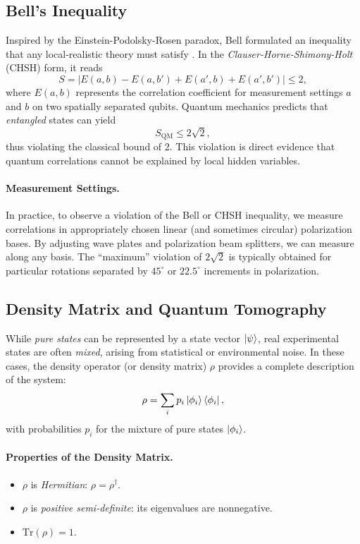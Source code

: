 \subsection{Bell's Inequality}
Inspired by the Einstein-Podolsky-Rosen paradox, Bell formulated an inequality that any local-realistic theory must satisfy \cite{Bell1964}. In the \emph{Clauser-Horne-Shimony-Holt} (CHSH) form, it reads
\[
S = | E(a,b) - E(a,b') + E(a',b) + E(a',b') | \le 2,
\]
where $E(a,b)$ represents the correlation coefficient for measurement settings $a$ and $b$ on two spatially separated qubits. Quantum mechanics predicts that \emph{entangled} states can yield
\[
S_\text{QM} \le 2\sqrt{2},
\]
thus violating the classical bound of 2. This violation is direct evidence that quantum correlations cannot be explained by local hidden variables.

\paragraph{Measurement Settings.}
In practice, to observe a violation of the Bell or CHSH inequality, we measure correlations in appropriately chosen linear (and sometimes circular) polarization bases. By adjusting wave plates and polarization beam splitters, we can measure along any basis. The ``maximum'' violation of $2\sqrt{2}$ is typically obtained for particular rotations separated by $45^\circ$ or $22.5^\circ$ increments in polarization.

\subsection{Density Matrix and Quantum Tomography}
While \emph{pure states} can be represented by a state vector $\ket{\psi}$, real experimental states are often \emph{mixed}, arising from statistical or environmental noise. In these cases, the density operator (or density matrix) $\rho$ provides a complete description of the system:
\[
\rho = \sum_i p_i \ket{\phi_i}\bra{\phi_i},
\]
with probabilities $p_i$ for the mixture of pure states $\ket{\phi_i}$. 

\paragraph{Properties of the Density Matrix.}
\begin{itemize}
    \item $\rho$ is \emph{Hermitian}: $\rho = \rho^\dagger$.
    \item $\rho$ is \emph{positive semi-definite}: its eigenvalues are nonnegative.
    \item $\text{Tr}(\rho) = 1$.
\end{itemize}

